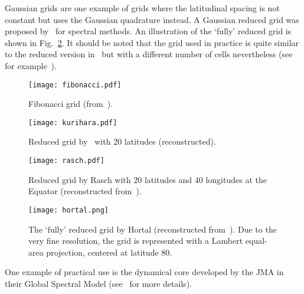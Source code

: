 Gaussian grids are one example of grids where the latitudinal spacing is not
constant but uses the Gaussian quadrature instead. A Gaussian reduced grid was
proposed by~\cite{Hortal1990} for spectral methods. An illustration of the
`fully' reduced grid is shown in Fig.~\ref{fig:hortal}.  It should be noted that
the grid used in practice is quite similar to the reduced version
in~\cite{Hortal1990} but with a different number of cells nevertheless (see for
example~). 
\begin{figure}
  \begin{minipage}[b]{0.48\linewidth}
    \centering
    \texttt{[image: fibonacci.pdf]}
    \caption{Fibonacci grid (from~\cite{Swinbank2006}).}
\label{fig:fibonacci}
  \end{minipage}
  \hfill
  \begin{minipage}[b]{0.45\linewidth}
    \centering
    \texttt{[image: kurihara.pdf]}
    \caption{Reduced grid by~\cite{Kurihara1965} with 20 latitudes (reconstructed).}
\label{fig:kurihara}
  \end{minipage}
\end{figure}
\begin{figure}
  \begin{minipage}[t]{0.45\linewidth}
    \centering
    \texttt{[image: rasch.pdf]}
    \caption{Reduced grid by Rasch with 20 latitudes and 40 longitudes at the
      Equator (reconstructed from~\cite{Rasch1994}).}
\label{fig:rasch}
  \end{minipage}
  \hfill
  \begin{minipage}[t]{0.48\linewidth}
    \centering
    \texttt{[image: hortal.png]}
    \caption{The `fully' reduced grid by Hortal (reconstructed
      from~\cite{Rasch1994}). Due to the very fine resolution, the grid is
      represented with a \gls{Lambert equal-area projection}, centered at latitude
  80\degree. }
\label{fig:hortal}
  \end{minipage}
  \hfill
\end{figure}
One example of practical use is the dynamical core developed by the \gls{JMA} in
their Global Spectral Model (see~\cite{JMA2013} for more details).

